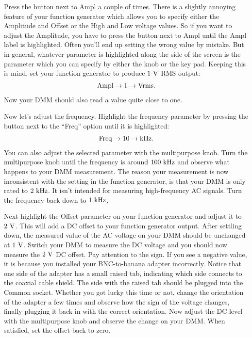 Press the button next to Ampl a couple of times.  There is a slightly
annoying feature of your function generator which allows you to
specify either the Amplitude and Offset or the High and Low voltage
values.  So if you want to adjust the Amplitude, you have to press the
button next to Ampl until the Ampl label is highlighted.  Often you'll
end up setting the wrong value by mistake.  But in general, whatever
parameter is highlighted along the side of the screen is the parameter
which you can specify by either the knob or the key pad.  Keeping this
is mind, set your function generator to produce $1~\rm V$ RMS output:
\begin{displaymath}
\rm Ampl \to 1 \to Vrms.
\end{displaymath}
Now your DMM should also read a value quite close to one.

Now let's adjust the frequency. Highlight the frequency parameter by pressing the button next to the ``Freq'' option until it is highlighted:
\begin{displaymath}
\rm Freq \to 10 \to kHz.
\end{displaymath}
You can also adjust the selected parameter with the multipurpose knob.
Turn the multipurpose knob until the frequency is around $100~\rm kHz$
and observe what happens to your DMM measurement.  The reason your measurement is now inconsistent with the setting in the function generator, is that your DMM is only rated to $2~\rm kHz$.  It isn't intended for measuring
high-frequency AC signals.  Turn the frequency back down to $1~\rm kHz$.

Next highlight the Offset parameter on your function generator and
adjust it to $2~\rm V$.  This will add a DC offset to your function
generator output.  After settling down, the measured value of the AC
voltage on your DMM should be unchanged at $1~\rm V$.  Switch your DMM
to measure the DC voltage and you should now measure the $2~\rm V$ DC
offset.  Pay attention to the sign.  If you see a negative value, it
is because you installed your BNC-to-banana adapter incorrectly.
Notice that one side of the adapter has a small raised tab, indicating
which side connects to the coaxial cable shield.  The side with the
raised tab should be plugged into the Common socket.  Whether you got
lucky this time or not, change the orientation of the adapter a few
times and observe how the sign of the voltage changes, finally
plugging it back in with the correct orientation. Now adjust the DC
level with the multipurpose knob and observe the change on your DMM.
When satisfied, set the offset back to zero.

